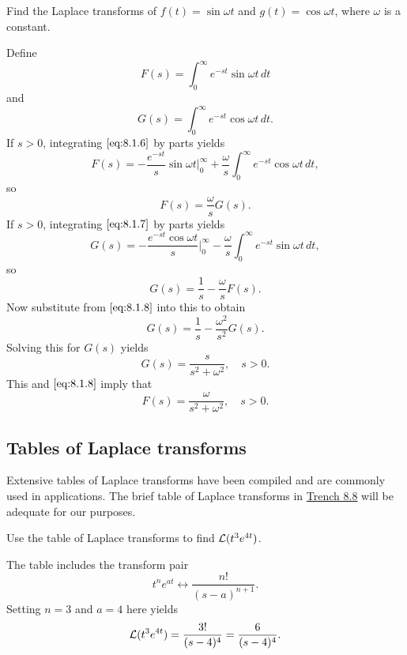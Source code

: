 \documentclass{ximera}
\begin{document}
\begin{example}\label{example:8.1.4} 
Find the Laplace transforms of $f(t)=\sin\omega t$ and
$g(t)=\cos\omega t$, where $\omega$ is a constant.

\begin{explanation}  
Define
\begin{equation}\label{eq:8.1.6}
F(s)=\int_0^\infty e^{-st}\sin\omega t\,dt
\end{equation}
and
\begin{equation}\label{eq:8.1.7}
G(s)=\int_0^\infty e^{-st}\cos\omega t\,dt.
\end{equation}
If $s>0$, integrating  $\eqref{eq:8.1.6}$ by parts yields
$$
F(s)=-\frac{e^{-st}}{s}\sin\omega t\Big|_0^\infty+\frac{\omega}{s}
\int_0^\infty e^{-st}\cos\omega t\,dt,
$$
so
\begin{equation}\label{eq:8.1.8}
F(s)=\frac{\omega}{s}G(s).
\end{equation}
If $s>0$, integrating  $\eqref{eq:8.1.7}$ by parts yields
$$
G(s)=-\frac{e^{-st}\cos\omega t}{s}\Big|_0^\infty - \frac{\omega}{s}
\int_0^\infty e^{-st}\sin\omega t\,dt,
$$
so
$$
G(s)=\frac{1}{s} - \frac{\omega}{s} F(s).
$$
Now substitute from  $\eqref{eq:8.1.8}$ into this to obtain
$$
G(s)=\frac{1}{s} - \frac{\omega^2}{s^2} G(s).
$$
Solving this for $G(s)$ yields
$$
G(s)=\frac{s}{s^2+\omega^2},\quad s>0.
$$
This and $\eqref{eq:8.1.8}$ imply that
$$
F(s)=\frac{\omega}{s^2+\omega^2},\quad s>0.
$$
\end{explanation}
\end{example}
\subsection*{Tables of Laplace transforms}

Extensive tables of Laplace transforms have been compiled and are
commonly used in applications. The brief table of Laplace transforms
in \href{https://ximera.osu.edu/ode/main/laplaceTable/laplaceTable}{Trench 8.8} 
will be adequate for our purposes.

\begin{example}\label{example:8.1.5}  Use the
table of Laplace transforms to find  ${\cal L}(t^3e^{4t})$.

\begin{explanation}
The table includes the transform pair
$$
t^ne^{at}\leftrightarrow \frac{n!}{(s-a)^{n+1}}.
$$
Setting $n=3$ and $a=4$ here yields
$$
{\cal L}(t^3e^{4t})=\frac{3!}{(s-4)^4}=\frac{6}{(s-4)^4}.
$$
\end{explanation}
\end{example}
\end{document}

